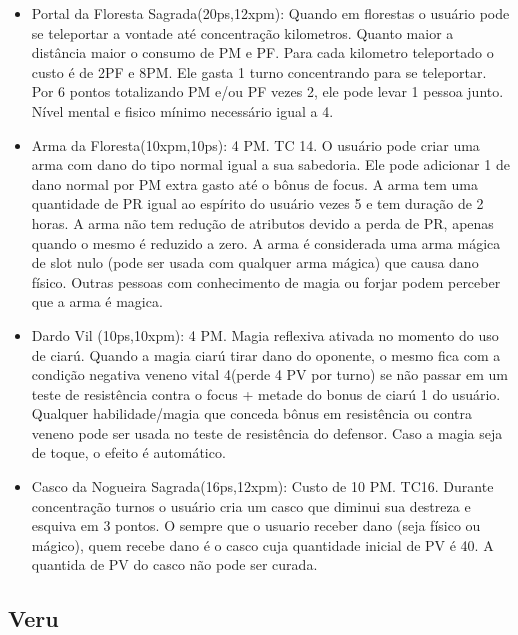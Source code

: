 \begin{itemize}
  	\item Portal da Floresta Sagrada(20ps,12xpm): Quando em florestas o usuário pode se teleportar a vontade até concentração kilometros. Quanto maior a distância maior o consumo de PM e PF. Para cada kilometro teleportado o custo é de 2PF e 8PM. Ele gasta 1 turno concentrando para se teleportar. Por 6 pontos totalizando PM e/ou PF vezes 2, ele pode levar 1 pessoa junto.  Nível mental e fisico mínimo necessário  igual a 4.

	\item Arma da Floresta(10xpm,10ps): 4 PM. TC 14.\newline
O usuário pode criar uma arma com dano do tipo normal igual a sua sabedoria. Ele pode adicionar 1 de dano normal por PM extra gasto até o bônus de focus. A arma tem uma quantidade de PR igual ao espírito do usuário vezes 5 e tem duração de 2 horas. A arma não tem redução de atributos devido a perda de PR, apenas quando o mesmo é reduzido a zero. A arma é considerada uma arma mágica de slot nulo (pode ser usada com qualquer arma mágica) que causa dano físico. Outras pessoas com conhecimento de magia ou forjar podem perceber que a arma é magica.

	\item Dardo Vil (10ps,10xpm): 4 PM. Magia reflexiva ativada no momento do uso de ciarú.\newline
Quando a magia ciarú tirar dano do oponente, o mesmo fica com a condição negativa veneno vital 4(perde 4 PV por turno) se não passar em um teste de resistência contra o focus + metade do bonus de ciarú 1 do usuário. Qualquer habilidade/magia que conceda bônus em resistência ou contra veneno pode ser usada no teste de resistência do defensor. Caso a magia seja de toque, o efeito é automático. 

	\item Casco da Nogueira Sagrada(16ps,12xpm): Custo de 10 PM. TC16. \newline	
Durante concentração turnos o usuário cria um casco que diminui sua destreza e esquiva em 3 pontos. O sempre que o usuario receber dano (seja físico ou mágico), quem recebe dano é o casco cuja quantidade inicial de PV é 40. A quantida de PV do casco não pode ser curada.
	
\end{itemize}


\subsection{Veru}

